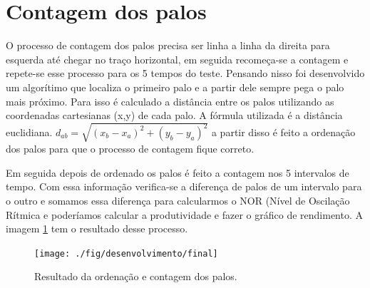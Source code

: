 \section{Contagem dos palos}
\label{sec:ident-palos}

O processo de contagem dos palos precisa ser linha a linha da direita para esquerda até chegar no traço horizontal, em seguida recomeça-se a contagem e repete-se esse processo para os 5 tempos do teste. Pensando nisso foi desenvolvido um algorítimo que localiza o primeiro palo e a partir dele sempre pega o palo mais próximo. Para isso é calculado a distância entre os palos utilizando as coordenadas cartesianas (x,y) de cada palo. A fórmula utilizada é a distância euclidiana. $d_{ab}=\sqrt{(x_b - x_a)^2 + (y_b - y_a)^2}$  a partir disso é feito a ordenação dos palos para que o processo de contagem fique correto.

Em seguida depois de ordenado os palos é feito a contagem  nos 5 intervalos de tempo. Com essa informação verifica-se a diferença de palos de um intervalo para o outro e somamos essa diferença para calcularmos o NOR (Nível de Oscilação Rítmica e poderíamos calcular a produtividade e fazer o gráfico de rendimento. A imagem \ref{fig:ord-contagem} tem o resultado desse processo.

\begin{figure}[H]
 \centering
 \texttt{[image: ./fig/desenvolvimento/final]}
 \caption{Resultado da ordenação e contagem dos palos.}
 \label{fig:ord-contagem}
\end{figure}





